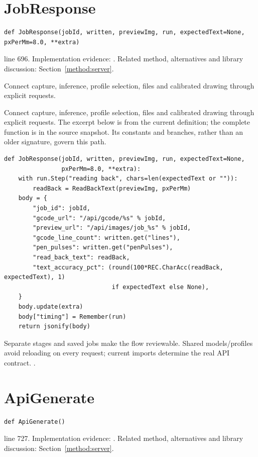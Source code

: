 \section{JobResponse}\label{fn:web-server:JobResponse}
\begin{lstlisting}[style=sig]
def JobResponse(jobId, written, previewImg, run, expectedText=None, pxPerMm=8.0, **extra)
\end{lstlisting}
 line 696. Implementation evidence: \cite{code2026}. Related method, alternatives and library discussion: Section~\ref{method:server}.


Connect capture, inference, profile selection, files and calibrated drawing through explicit requests.


Connect capture, inference, profile selection, files and calibrated drawing through explicit requests. The excerpt below is from the current definition; the complete function is in the source snapshot. Its constants and branches, rather than an older signature, govern this path.


\begin{lstlisting}[style=plain]
def JobResponse(jobId, written, previewImg, run, expectedText=None,
                pxPerMm=8.0, **extra):
    with run.Step("reading back", chars=len(expectedText or "")):
        readBack = ReadBackText(previewImg, pxPerMm)
    body = {
        "job_id": jobId,
        "gcode_url": "/api/gcode/%s" % jobId,
        "preview_url": "/api/images/job_%s" % jobId,
        "gcode_line_count": written.get("lines"),
        "pen_pulses": written.get("penPulses"),
        "read_back_text": readBack,
        "text_accuracy_pct": (round(100*REC.CharAcc(readBack, expectedText), 1)
                              if expectedText else None),
    }
    body.update(extra)
    body["timing"] = Remember(run)
    return jsonify(body)
\end{lstlisting}
Separate stages and saved jobs make the flow reviewable. Shared models/profiles avoid reloading on every request; current imports determine the real API contract. \cite{flaskdocs,pillowops,code2026}.


\section{ApiGenerate}\label{fn:web-server:ApiGenerate}
\begin{lstlisting}[style=sig]
def ApiGenerate()
\end{lstlisting}
 line 727. Implementation evidence: \cite{code2026}. Related method, alternatives and library discussion: Section~\ref{method:server}.


